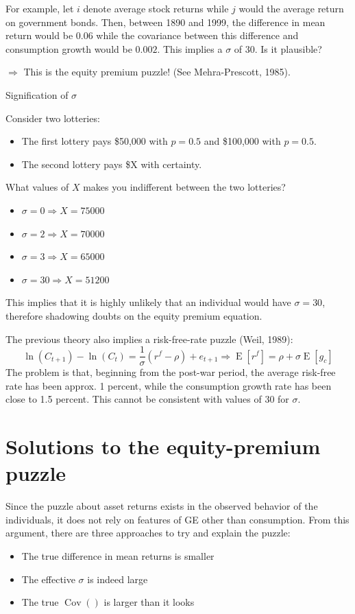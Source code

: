 \documentclass[12pt]{report}
\newcommand{\E}[1]{\operatorname{E}\left[#1\right]}
\newcommand{\cov}[1]{\operatorname{Cov}\left(#1\right)}
\begin{document}
For example, let $i$ denote average stock returns while $j$ would the average return on government bonds. Then, between 1890 and 1999, the difference in mean return would be $0.06$ while the covariance between this difference and consumption growth would be $0.002$. This implies a $\sigma$ of $30$. Is it plausible?

\begin{center}
$\Rightarrow$ This is the equity premium puzzle! (See Mehra-Prescott, 1985).
\end{center}

\begin{bclogo}[couleur=blue!10, arrondi=0.1, logo=,ombre=false]{ Signification of $\sigma$} 

Consider two lotteries:\begin{itemize}
\item The first lottery pays \$50,000 with $p=0.5$ and \$100,000 with $p=0.5$.
\item The second lottery pays \$X with certainty.
\end{itemize}
What values of $X$ makes you indifferent between the two lotteries? \begin{itemize}
\item $\sigma = 0 \Rightarrow X = 75000$
\item $\sigma = 2 \Rightarrow X = 70000$
\item $\sigma = 3 \Rightarrow X = 65000$
\item $\sigma = 30 \Rightarrow X = 51200$
\end{itemize}
This implies that it is highly unlikely that an individual would have $\sigma = 30$, therefore shadowing doubts on the equity premium equation.
\end{bclogo}

The previous theory also implies a risk-free-rate puzzle (Weil, 1989): $$\ln(C_{t+1}) - \ln(C_t) = \frac{1}{\sigma}(r^f - \rho) + e_{t+1} \Rightarrow \E{r^f} = \rho + \sigma\E{g_c} $$
The problem is that, beginning from the post-war period, the average risk-free rate has been approx. 1 percent, while the consumption growth rate has been close to 1.5 percent. This cannot be consistent with values of $30$ for $\sigma$.

\section{Solutions to the equity-premium puzzle}

Since the puzzle about asset returns exists in the observed behavior of the individuals, it does not rely on features of GE other than consumption. From this argument, there are three approaches to try and explain the puzzle:\begin{itemize}
\item The true difference in mean returns is smaller
\item The effective $\sigma$ is indeed large
\item The true $\cov{}$ is larger than it looks
\end{itemize}
\end{document}
